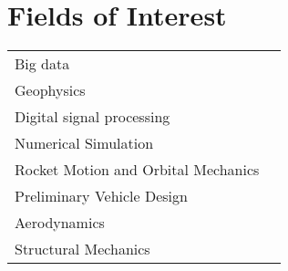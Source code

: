 \documentclass[a4paper]{article}
\newenvironment{cvsection}[2]{
  \vspace{0.2in}
  \section*{#1}
  \vspace{-0.2in}
  \begin{longtable}{lp{#2}}
}{
  \end{longtable}
}
\begin{document}
\clearpage


\begin{cvsection}{Fields of Interest}{10cm}
 Big data & \\
 Geophysics & \\
 Digital signal processing & \\
 Numerical Simulation & \\
 Rocket Motion and Orbital Mechanics & \\
 Preliminary Vehicle Design & \\
 Aerodynamics & \\
 Structural Mechanics & \\
\end{cvsection}

\end{document}
